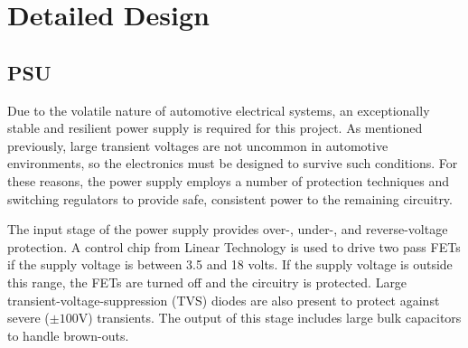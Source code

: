 \chapter{Detailed Design}
\label{chap:detailed-design}




\section{PSU}
Due to the volatile nature of automotive electrical systems, an exceptionally stable and 
resilient power supply is required for this project.  As mentioned previously, large
transient voltages are not uncommon in automotive environments, so the electronics must
be designed to survive such conditions.  For these reasons, the power supply employs 
a number of protection techniques and switching regulators to provide safe, consistent 
power to the remaining circuitry.

The input stage of the power supply provides over-, under-, and reverse-voltage
protection.  A control chip from Linear Technology \cite{ltc4365ds} is used to drive two pass
FETs if the supply voltage is between 3.5 and 18 volts.  If the supply voltage
is outside this range, the FETs are turned off and the circuitry is
protected.  Large transient-voltage-suppression (TVS) diodes are also present to
protect against severe ($\pm 100$V) transients.  The output of this stage includes
large bulk capacitors to handle brown-outs.

